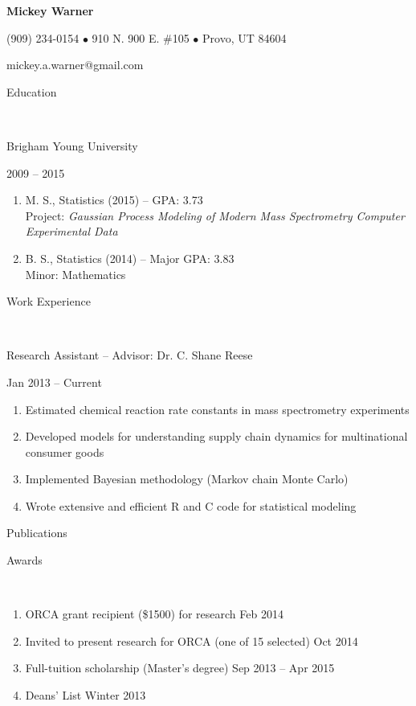 \documentclass[12pt]{article}
\newcommand{\head}[1]{ %
    \bigskip %
    \bigskip %
    \begin{Large}\begin{bf}{#1}\end{bf}\end{Large} %

    \ \\ [-1.3cm] %

    \hrulefill}
\newcommand{\subhead}[1]{\begin{sc}{#1}\end{sc}}
\begin{document}

\centerline{ \Huge \bf Mickey Warner }
\smallskip
\centerline{ (909) 234-0154 $\bullet$ 910 N. 900 E. \#105 $\bullet$ Provo, UT 84604 }
\smallskip
\centerline{ mickey.a.warner@gmail.com }
\bigskip


\head{Education}

\subhead{Brigham Young University} \hfill 2009 -- 2015

\begin{enumerate}[label=$\cdot$]
\item M. S., Statistics (2015) -- GPA: 3.73 \\
Project: \emph{Gaussian Process Modeling of Modern Mass Spectrometry Computer Experimental Data}
\item B. S., Statistics (2014) -- Major GPA: 3.83 \\
Minor: Mathematics
\end{enumerate}

\head{Work Experience}

\subhead{Research Assistant -- Advisor: Dr. C. Shane Reese} \hfill Jan 2013 -- Current

\begin{enumerate}[label=$\cdot$]
\item Estimated chemical reaction rate constants in mass spectrometry experiments
\item Developed models for understanding supply chain dynamics for multinational consumer goods
\item Implemented Bayesian methodology (Markov chain Monte Carlo)
\item Wrote extensive and efficient R and C code for statistical modeling
\end{enumerate}

\subhead{Publications}

\begin{enumerate}[label=$\cdot$]
\end{enumerate}

\head{Awards}

\begin{enumerate}[label=$\cdot$]
\item ORCA grant recipient (\$1500) for research \hfill Feb 2014
\item Invited to present research for ORCA (one of 15 selected) \hfill Oct 2014
\item Full-tuition scholarship (Master's degree) \hfill Sep 2013 -- Apr 2015
\item Deans' List \hfill Winter 2013
\end{enumerate}
\end{document}
